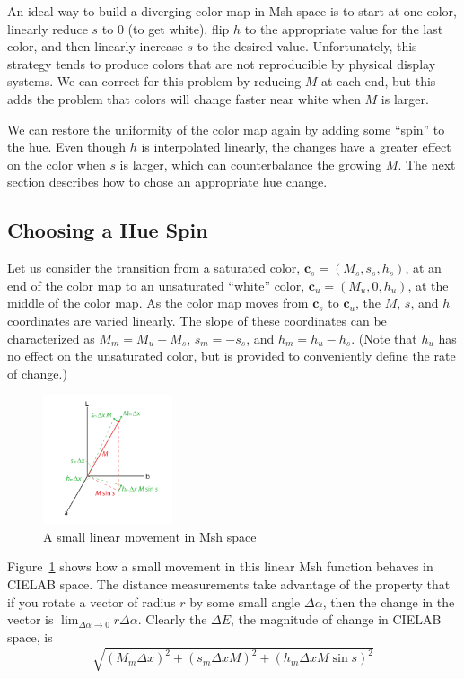 \documentclass[twocolumn]{article}
\newcommand{\Lab}{CIELAB\xspace}
\newcommand{\Msh}{Msh\xspace}
\newcommand{\DeltaE}{\ensuremath{\Delta{}E}\xspace}
\newcommand*{\cvec}[1]{\mathbf{#1}}
\begin{document}
An ideal way to build a diverging color map in \Msh space is to start at
one color, linearly reduce $s$ to 0 (to get white), flip $h$ to the
appropriate value for the last color, and then linearly increase $s$ to the
desired value.  Unfortunately, this strategy tends to produce colors that
are not reproducible by physical display systems.  We can correct for this
problem by reducing $M$ at each end, but this adds the problem that colors
will change faster near white when $M$ is larger.

We can restore the uniformity of the color map again by adding some
``spin'' to the hue.  Even though $h$ is interpolated linearly, the changes
have a greater effect on the color when $s$ is larger, which can
counterbalance the growing $M$.  The next section describes how to chose an
appropriate hue change.

\subsection{Choosing a Hue Spin}
\label{sec:ChoosingAHueSpin}

Let us consider the transition from a saturated color, $\cvec{c}_s=(M_s,
s_s, h_s)$, at an end of the color map to an unsaturated ``white'' color,
$\cvec{c}_u=(M_u, 0, h_u)$, at the middle of the color map.  As the
color map moves from $\cvec{c}_s$ to $\cvec{c}_u$, the $M$, $s$, and $h$
coordinates are varied linearly.  The slope of these coordinates can be
characterized as $M_m = M_u - M_s$, $s_m = -s_s$, and $h_m = h_u - h_s$.
(Note that $h_u$ has no effect on the unsaturated color, but is provided to
conveniently define the rate of change.)

\begin{figure}
  \centering
  \includegraphics[height=1.5in]{images/MshDeltaMovements}
  \caption{A small linear movement in \Msh space}
  \label{sec:LinearMshMovement}
\end{figure}

Figure~\ref{sec:LinearMshMovement} shows how a small movement in this
linear \Msh function behaves in \Lab space.  The distance measurements take
advantage of the property that if you rotate a vector of radius $r$ by some
small angle $\Delta\alpha$, then the change in the vector is
$\lim_{\Delta\alpha \rightarrow 0}r \Delta\alpha$.  Clearly the \DeltaE,
the magnitude of change in \Lab space, is
\begin{equation}
  \sqrt{(M_m \Delta x)^2 + (s_m \Delta x M)^2 + (h_m \Delta x M \sin s)^2}
  \label{eq:DeltaEforLinearMshMovement}
\end{equation}
\end{document}
